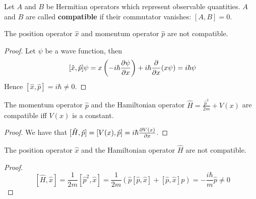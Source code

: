 \begin{definition}
	Let $A$ and $B$ be Hermitian operators which represent observable quantities. $A$ and $B$ are called \textbf{compatible} if their commutator vanishes: $[A, B] = 0$.
\end{definition}

\begin{proposition}
	The position operator $\hat{x}$ and momentum operator $\hat{p}$ are not compatible.
\end{proposition}

\begin{proof}
	Let $\psi$ be a wave function, then
	\[
		[\hat{x}, \hat{p}] \psi = x \left( -i\hbar \diffp{\psi}{x} \right) + i \hbar \diffp{}{x} (x \psi) = i \hbar \psi
	\]
	Hence $[\hat{x}, \hat{p}] = i\hbar \ne 0$.
\end{proof}

\begin{proposition}
	The momentum operator $\hat{p}$ and the Hamiltonian operator $\hat{H} = \frac{\hat{p}^2}{2m} + V(x)$ are compatible iff $V(x)$ is a constant.
\end{proposition}

\begin{proof}
	We have that $[\hat{H}, \hat{p}] = [V(x), \hat{p}] = i\hbar \diffp{V(x)}{x}$.
\end{proof}

\begin{proposition}
	The position operator $\hat{x}$ and the Hamiltonian operator $\hat{H}$ are not compatible.
\end{proposition}

\begin{proof}
	\[
		[\hat{H}, \hat{x}] = \frac{1}{2m} [\hat{p}^2, \hat{x}] = \frac{1}{2m} (\hat{p} [\hat{p}, \hat{x}] + [\hat{p}, \hat{x}] p) = -\frac{i\hbar}{m} \hat{p} \ne 0
	\]
\end{proof}


